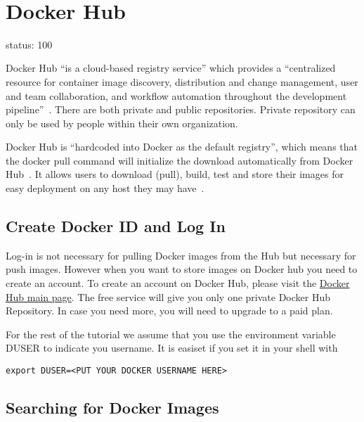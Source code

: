 \FILENAME\



\section{Docker Hub}

\label{s:dockerhub}

status: 100

Docker Hub ``is a cloud-based registry service'' which provides a 
``centralized resource for container image discovery, distribution and 
change management, user and team collaboration, and workflow automation 
throughout the development 
pipeline''~\cite{hid-sp18-405-tutorial-dockerhub-overview}. There are both 
private and public repositories. Private repository can only be used by people 
within their own organization.

Docker Hub is ``hardcoded into Docker as the default registry'', which means 
that the docker pull command will initialize the download automatically from 
Docker Hub~\cite{hid-sp18-405-tutorial-dockerhub-blog-use}. It allows users 
to download (pull), build, test and store their images for easy deployment on 
any host they may have~\cite{hid-sp18-405-tutorial-dockerhub-overview}.


\subsection{Create Docker ID and Log In }

Log-in is not necessary for pulling Docker images from the Hub but 
necessary for push images. However when you want to store images on 
Docker hub you need to create an account.  To create an account on Docker 
Hub, please visit the \href{https://hub.docker.com/}{Docker Hub main page}. 
The free service will give you only one private Docker Hub Repository. In case 
you need more, you will need to upgrade to a paid plan.

For the rest of the tutorial we assume that you use the environment
variable DUSER to indicate you username. It is easiset if you set it
in your shell with

\begin{lstlisting}
export DUSER=<PUT YOUR DOCKER USERNAME HERE> 
\end{lstlisting}

\subsection{Searching for Docker Images}

